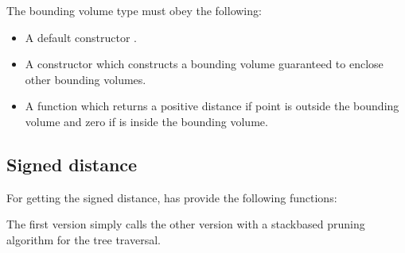 \documentclass[letterpaper,10pt,english]{sphinxmanual}
\begin{document}
\sphinxAtStartPar
The bounding volume type  must obey the following:
\begin{itemize}
\item {} 
\sphinxAtStartPar
A default constructor .

\item {} 
\sphinxAtStartPar
A constructor  which constructs a bounding volume guaranteed to enclose other bounding volumes.

\item {} 
\sphinxAtStartPar
A function  which returns a positive distance if point  is outside the bounding volume and zero if  is inside the bounding volume.

\end{itemize}


\subsection{Signed distance}
\label{\detokenize{ImplemBVH:signed-distance}}
\sphinxAtStartPar
For getting the signed distance,  has provide the following functions:

\begin{sphinxVerbatim}[commandchars=\\\{\}]

\end{sphinxVerbatim}

\sphinxAtStartPar
The first version simply calls the other version with a stack\sphinxhyphen{}based pruning algorithm for the tree traversal.
\end{document}
